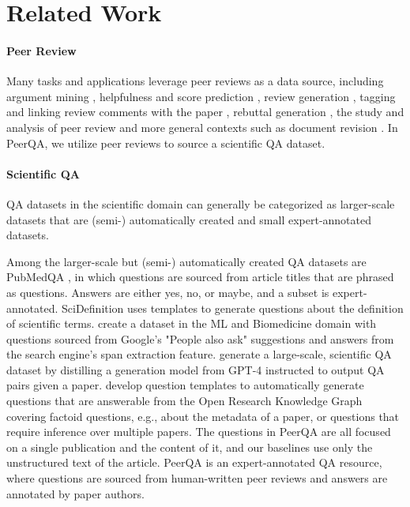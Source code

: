 \section{Related Work}
\paragraph{Peer Review} Many tasks and applications leverage peer reviews as a data source, including argument mining \citep{hua-etal-2019-argument, cheng-etal-2020-ape, kennard-etal-2022-disapere}, helpfulness and score prediction \citep{xiong-litman-2011-automatically, gao-etal-2019-rebuttal}, review generation \citep{auto-peer-review,darcy-marg-2024}, tagging and linking review comments with the paper \citep{kuznetsov-etal-2022-revise, darcy-etal-2024-aries}, rebuttal generation \citep{purkayastha-etal-2023-exploring}, the study and analysis of peer review \citep{kang-etal-2018-dataset, ghosal2022peer} and more general contexts such as document revision \citep{ruan-etal-2024-re3}. In PeerQA, we utilize peer reviews to source a scientific QA dataset.

\paragraph{Scientific QA} QA datasets in the scientific domain can generally be categorized as larger-scale datasets that are (semi-) automatically created and small expert-annotated datasets. 



Among the larger-scale but (semi-) automatically created QA datasets are PubMedQA \citep{jin-etal-2019-pubmedqa}, in which questions are sourced from article titles that are phrased as questions. Answers are either yes, no, or maybe, and a subset is expert-annotated. SciDefinition \citep{august-etal-2022-generating} uses templates to generate questions about the definition of scientific terms. \citet{kulshreshtha-etal-2021-back} create a dataset in the ML and Biomedicine domain with questions sourced from Google's "People also ask" suggestions and answers from the search engine's span extraction feature. 
\citet{wan2024sciqag} generate a large-scale, scientific QA dataset by distilling a generation model from \mbox{GPT-4} instructed to output QA pairs given a paper. 
\citet{auer-et-al-2023-sciqa} develop question templates to automatically generate questions that are answerable from the Open Research Knowledge Graph \citep{jaradeh-et-al-2019-orkg} covering factoid questions, e.g., about the metadata of a paper, or questions that require inference over multiple papers. The questions in PeerQA are all focused on a single publication and the content of it, and our baselines use only the unstructured text of the article. PeerQA is an expert-annotated QA resource, where questions are sourced from human-written peer reviews and answers are annotated by paper authors.

